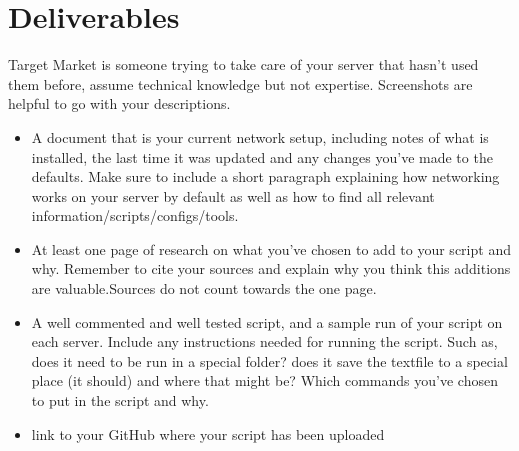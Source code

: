 \documentclass[12pt]{article}
\begin{document}
\section*{Deliverables}
Target Market is someone trying to take care of your server that hasn't used them before, assume technical knowledge but not expertise.  Screenshots are helpful to go with your descriptions. 

\begin{itemize}
    \item A  document that is your current network setup, including notes of what is installed, the last time it was updated and any changes you've made to the defaults. Make sure to include a short paragraph explaining how networking works on your server by default as well as how to find all relevant information/scripts/configs/tools.
    \item At least one page of research on what you've chosen to add to your script and why.  Remember to cite your sources and explain why you think this additions are valuable.Sources do not count towards the one page.
    \item A well commented and well tested script, and a sample run of your script on each server.  Include any instructions needed for running the script.  Such as, does it need to be run in a special folder? does it save the textfile to a special place (it should) and where that might be? Which commands you've chosen to put in the script and why.
    \item link to your GitHub where your script has been uploaded
\end{itemize}
\end{document}
